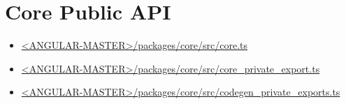 \section{Core Public API}


\begin{itemize}
  \item \href{https://github.com/angular/angular/blob/master/packages/core/src/core.ts}
        {<ANGULAR-MASTER>/packages/core/src/core.ts}
\end{itemize}






\begin{itemize}
  \item \href{https://github.com/angular/angular/blob/master/packages/core/src/core_private_export.ts}
        {<ANGULAR-MASTER>/packages/core/src/core\_private\_export.ts}
\end{itemize}










\begin{itemize}
  \item \href{https://github.com/angular/angular/blob/master/packages/core/src/codegen_private_exports.ts}
        {<ANGULAR-MASTER>/packages/core/src/codegen\_private\_exports.ts}
\end{itemize}




